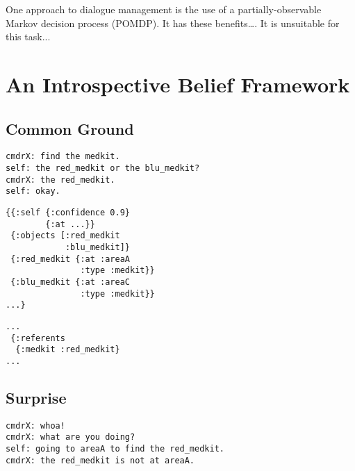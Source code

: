 \documentclass[12pt]{article}
\begin{document}
One approach to dialogue management is the use of a
partially-observable Markov decision process (POMDP). It has these
benefits\dots{}. It is unsuitable for this task...


\section{An Introspective Belief Framework}


\subsection{Common Ground}
\begin{verbatim}
cmdrX: find the medkit.
self: the red_medkit or the blu_medkit?
cmdrX: the red_medkit.
self: okay.
\end{verbatim}

\begin{verbatim}
{{:self {:confidence 0.9}
        {:at ...}}
 {:objects [:red_medkit
            :blu_medkit]}
 {:red_medkit {:at :areaA
               :type :medkit}}
 {:blu_medkit {:at :areaC
               :type :medkit}}
...}
\end{verbatim}

\begin{verbatim}
...
 {:referents
  {:medkit :red_medkit}
...
\end{verbatim}
\subsection{Surprise}

\begin{verbatim}
cmdrX: whoa!
cmdrX: what are you doing?
self: going to areaA to find the red_medkit.
cmdrX: the red_medkit is not at areaA.
\end{verbatim}
\end{document}
